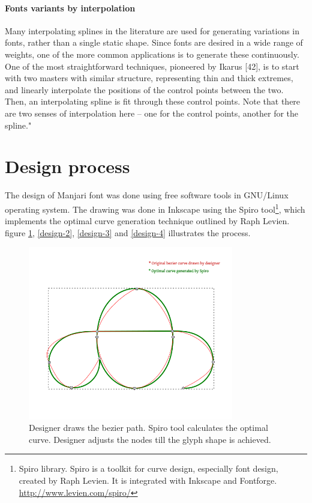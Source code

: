 \documentclass[10pt]{article}
\begin{document}
\paragraph{Fonts variants by interpolation}
Many interpolating splines in the literature are used for generating variations in fonts, rather
than a single static shape. Since fonts are desired in a wide range of weights, one of the more
common applications is to generate these continuously. One of the most straightforward techniques,
pioneered by Ikarus [42], is to start with two masters with similar structure, representing thin
and thick extremes, and linearly interpolate the positions of the control points between the two.
Then, an interpolating spline is fit through these control points. Note that there are two senses of
interpolation here – one for the control points, another for the spline." \cite{lamport94}

\section{Design process}

The design of Manjari font was done using free software tools in GNU/Linux operating system. The drawing was done in Inkscape using the Spiro tool\footnote{Spiro library. Spiro is a toolkit for curve design, especially font design, created by Raph Levien. It is integrated with Inkscape and Fontforge. \url{http://www.levien.com/spiro/}}, which implements the optimal curve generation technique outlined by Raph Levien. figure \ref{design-1}, \ref{design-2}, \ref{design-3} and \ref{design-4} illustrates the process.

\begin{figure}[h!]
	\centering
	\includegraphics[width=0.8\textwidth]{images/design-1-spiral.png}
	\caption{Designer draws the bezier path. Spiro tool calculates the optimal curve. Designer adjusts the nodes till the glyph shape is achieved.}
	\label{design-1}
\end{figure}
\end{document}
